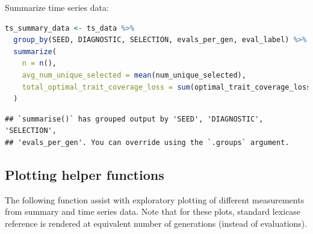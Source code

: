 \documentclass[
]{book}
\begin{document}
Summarize time series data:

\begin{lstlisting}[language=R]
ts_summary_data <- ts_data %>%
  group_by(SEED, DIAGNOSTIC, SELECTION, evals_per_gen, eval_label) %>%
  summarize(
    n = n(),
    avg_num_unique_selected = mean(num_unique_selected),
    total_optimal_trait_coverage_loss = sum(optimal_trait_coverage_loss)
  )
\end{lstlisting}

\begin{lstlisting}
## `summarise()` has grouped output by 'SEED', 'DIAGNOSTIC', 'SELECTION',
## 'evals_per_gen'. You can override using the `.groups` argument.
\end{lstlisting}

\hypertarget{plotting-helper-functions}{%
\subsection{Plotting helper functions}\label{plotting-helper-functions}}

The following function assist with exploratory plotting of different measurements from summary and time series data.
Note that for these plots, standard lexicase reference is rendered at equivalent number of generations (instead of evaluations).
\end{document}
